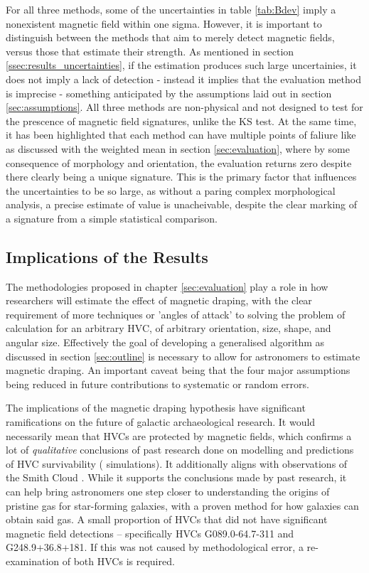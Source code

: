 For all three methods, some of the uncertainties in table \ref{tab:Bdev} imply a nonexistent magnetic field within one sigma. However, it is important to distinguish between the methods that aim to merely detect magnetic fields, versus those that estimate their strength. As mentioned in section \ref{ssec:results_uncertainties}, if the estimation produces such large uncertainies, it does not imply a lack of detection - instead it implies that the evaluation method is imprecise - something anticipated by the assumptions laid out in section \ref{sec:assumptions}. All three methods are non-physical and not designed to test for the prescence of magnetic field signatures, unlike the KS test. At the same time, it has been highlighted that each method can have multiple points of faliure like as discussed with the weighted mean in section \ref{sec:evaluation}, where by some consequence of morphology and orientation, the evaluation returns zero despite there clearly being a unique signature. This is the primary factor that influences the uncertainties to be so large, as without a paring complex morphological analysis, a precise estimate of value is unacheivable, despite the clear marking of a signature from a simple statistical comparison.

\subsection{Implications of the Results}
\label{ssec:B4}

The methodologies proposed in chapter \ref{sec:evaluation} play a role in how researchers will estimate the effect of magnetic draping, with the clear requirement of more techniques or 'angles of attack' to solving the problem of calculation for an arbitrary HVC, of arbitrary orientation, size, shape, and angular size. Effectively the goal of developing a generalised algorithm as discussed in section \ref{sec:outline} is necessary to allow for astronomers to estimate magnetic draping. An important caveat being that the four major assumptions being reduced in future contributions to systematic or random errors.


The implications of the magnetic draping hypothesis have significant ramifications on the future of galactic archaeological research. It would necessarily mean that HVCs are protected by magnetic fields, which confirms a lot of \textit{qualitative} conclusions of past research done on modelling and predictions of HVC survivability (\citeauthor{ID23} simulations). It additionally aligns with observations of the Smith Cloud \citep{ID5, ID26}. While it supports the conclusions made by past research, it can help bring astronomers one step closer to understanding the origins of pristine gas for star-forming galaxies, with a proven method for how galaxies can obtain said gas. A small proportion of HVCs that did not have significant magnetic field detections – specifically HVCs G089.0-64.7-311 and G248.9+36.8+181. If this was not caused by methodological error, a re-examination of both HVCs is required.


